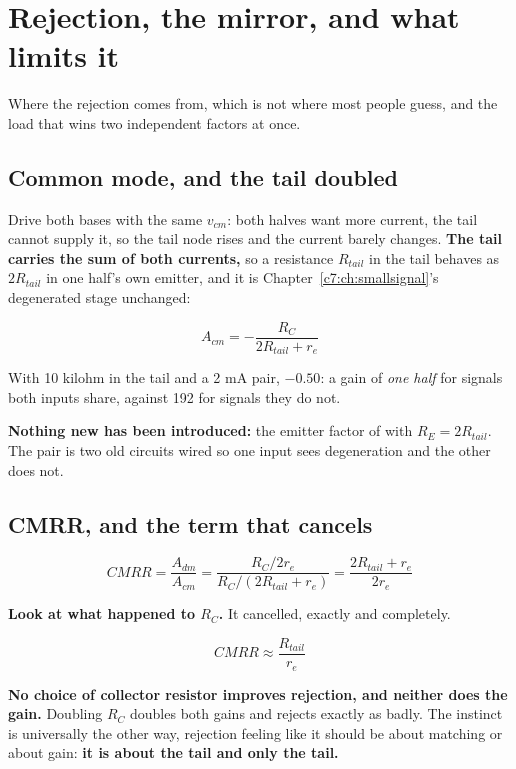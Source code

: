 
\section{Rejection, the mirror, and what limits it}
\label{c9:app:b}

Where the rejection comes from, which is not where most people guess, and the load that wins two independent factors at once.

\subsection{Common mode, and the tail doubled}
\label{c9:sec:b1}
Drive both bases with the same $v_{cm}$: both halves want more current, the tail cannot supply it, so the tail node rises and the current barely changes. \textbf{The tail carries the sum of both currents,} so a resistance $R_{tail}$ in the tail behaves as $2R_{tail}$ in one half's own emitter, and it is Chapter~\ref{c7:ch:smallsignal}'s degenerated stage unchanged:

\[
  A_{cm} = -\frac{R_C}{2R_{tail} + r_e}
\]

With 10 kilohm in the tail and a 2 mA pair, $-0.50$: a gain of \emph{one half} for signals both inputs share, against 192 for signals they do not.

\textbf{Nothing new has been introduced:} the emitter factor of  with $R_E = 2R_{tail}$. The pair is two old circuits wired so one input sees degeneration and the other does not.

\subsection{CMRR, and the term that cancels}
\label{c9:sec:b2}
\[
  CMRR = \frac{A_{dm}}{A_{cm}} = \frac{R_C/2r_e}{R_C/(2R_{tail} + r_e)} = \frac{2R_{tail} + r_e}{2 r_e}
\]

\textbf{Look at what happened to $R_C$.} It cancelled, exactly and completely.

\[
  \boxed{\;CMRR \approx \frac{R_{tail}}{r_e}\;}
\]

\textbf{No choice of collector resistor improves rejection, and neither does the gain.} Doubling $R_C$ doubles both gains and rejects exactly as badly. The instinct is universally the other way, rejection feeling like it should be about matching or about gain: \textbf{it is about the tail and only the tail.}

